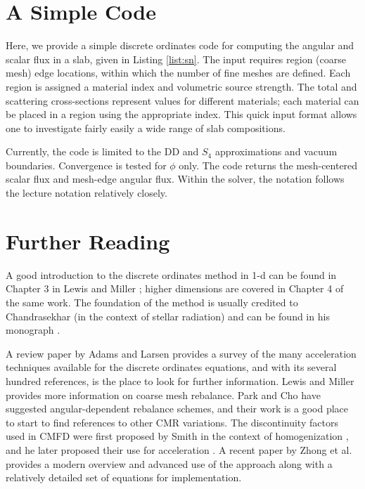 \section*{A Simple Code}

Here, we provide a simple discrete ordinates code for computing the angular and scalar flux in a slab, given in Listing \ref{list:sn}.  The input requires region (coarse mesh) edge locations, within which the number of fine meshes are defined.  Each region is assigned a material index and volumetric source strength.  The total and scattering cross-sections represent values for different materials; each material can be placed in a region using the appropriate index.  This quick input format allows one to investigate fairly easily a wide range of slab compositions.

Currently, the code is limited to the DD and $S_4$ approximations and vacuum boundaries.  Convergence is tested for $\phi$ only.  The code returns the mesh-centered scalar flux and mesh-edge angular flux.  Within the solver, the notation follows the lecture notation relatively closely.



\section*{Further Reading}

A good introduction to the discrete ordinates method in 1-d can be found in Chapter 3 in Lewis and Miller \cite{lewis1993cmn}; higher dimensions are covered in Chapter 4 of the same work.  The foundation of the method is usually credited to Chandrasekhar (in the context of stellar radiation) and can be found in his monograph \cite{chandrasekhar1950rt}.  

A review paper by Adams and Larsen \cite{adams2002fim} provides a survey of the many acceleration techniques available for the discrete ordinates equations, and with its several hundred references, is the place to look for further information.  Lewis and Miller provides more information on coarse mesh rebalance.  Park and Cho \cite{park2004cma} have suggested angular-dependent rebalance schemes, and their work is a good place to start to find references to other CMR variations.  The discontinuity factors used in CMFD were first proposed by Smith in the context of homogenization \cite{smith1980shm}, and he later proposed their use for acceleration \cite{smith1983nms}. A recent paper by Zhong et al. \cite{zhong2008itl} provides a modern overview and advanced use of the approach along with a relatively detailed set of equations for implementation.  

